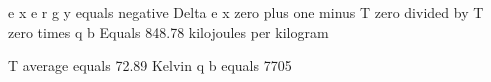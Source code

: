 e x e r g y equals negative Delta e x zero plus one minus T zero divided by T zero times q b  
Equals 848.78 kilojoules per kilogram  

T average equals 72.89 Kelvin  
q b equals 7705